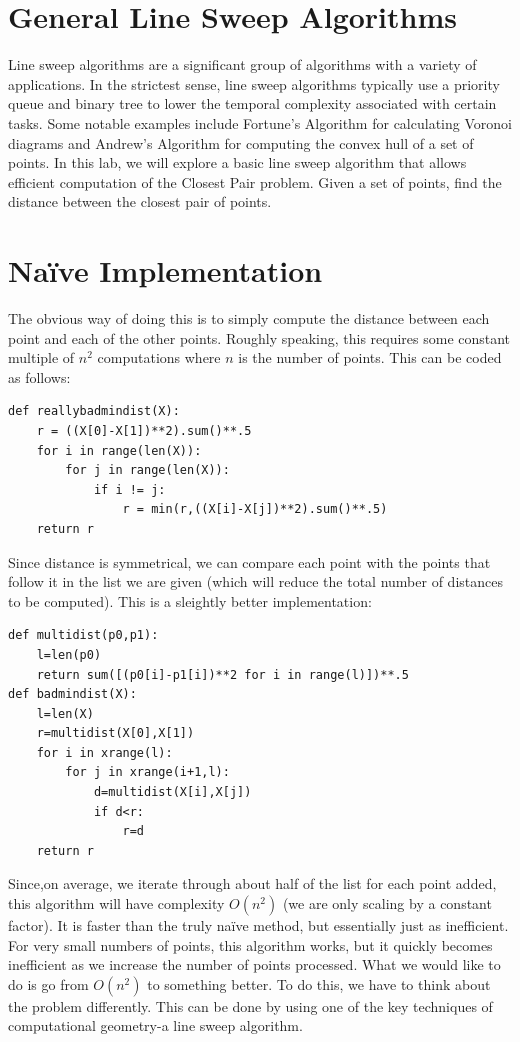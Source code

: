 \label{lab:Alg_Linesweep}


\section*{General Line Sweep Algorithms}

Line sweep algorithms are a significant group of algorithms with a variety of applications. 
In the strictest sense, line sweep algorithms typically use a priority queue and binary tree to lower the temporal complexity associated with certain tasks. 
Some notable examples include Fortune's Algorithm for calculating Voronoi diagrams and Andrew's Algorithm for computing the convex hull of a set of points. 
In this lab, we will explore a basic line sweep algorithm that allows efficient computation of the Closest Pair problem.  
Given a set of points, find the distance between the closest pair of points.

\section*{Na\"ive Implementation}

The obvious way of doing this is to simply compute the distance between each point and each of the other points.
Roughly speaking, this requires some constant multiple of $n^2$ computations where $n$ is the number of points.
This can be coded as follows:
\begin{lstlisting}
def reallybadmindist(X):
    r = ((X[0]-X[1])**2).sum()**.5
    for i in range(len(X)):
        for j in range(len(X)):
            if i != j:
                r = min(r,((X[i]-X[j])**2).sum()**.5)
    return r
\end{lstlisting}
Since distance is symmetrical, we can compare each point with the points that follow it in the list we are given (which will reduce
the total number of distances to be computed).
This is a sleightly better implementation:
\begin{lstlisting}
def multidist(p0,p1):
    l=len(p0)
    return sum([(p0[i]-p1[i])**2 for i in range(l)])**.5
def badmindist(X):
    l=len(X)
    r=multidist(X[0],X[1])
    for i in xrange(l):
        for j in xrange(i+1,l):
            d=multidist(X[i],X[j])
            if d<r:
                r=d
    return r
\end{lstlisting}

Since,on average, we iterate through about half of the list for each point added, this algorithm will have complexity $O(n^2)$ (we are only scaling by a constant factor).  
It is faster than the truly na\"ive method, but essentially just as inefficient.
For very small numbers of points, this algorithm works, but it quickly becomes inefficient as we increase the number of points processed.  
What we would like to do is go from $O(n^2)$ to something better.  
To do this, we have to think about the problem differently.
This can be done by using one of the key techniques of computational geometry-a line sweep algorithm.

